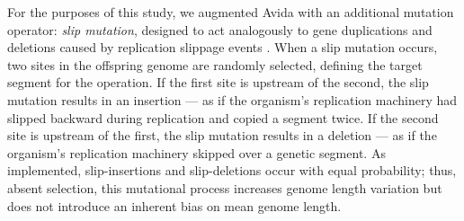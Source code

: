 For the purposes of this study, we augmented Avida with an additional mutation operator: \textit{slip mutation}, designed to act analogously to gene duplications and deletions caused by replication slippage events \citep{bzymek_instability_2001}.
When a slip mutation occurs, two sites in the offspring genome are randomly selected, defining the target segment for the operation.
If the first site is upstream of the second, the slip mutation results in an insertion --- as if the organism's replication machinery had slipped backward during replication and copied a segment twice.
If the second site is upstream of the first, the slip mutation results in a deletion --- as if the organism's replication machinery skipped over a genetic segment.
As implemented, slip-insertions and slip-deletions occur with equal probability; thus, absent selection, this mutational process increases genome length variation but does not introduce an inherent bias on mean genome length.

